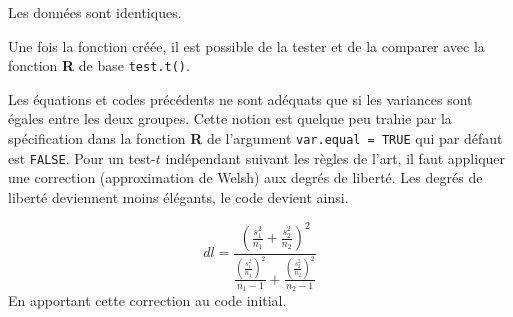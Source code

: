 \documentclass[
]{book}
\newenvironment{Shaded}{}{}
\newcommand{\AttributeTok}[1]{#1}
\newcommand{\CommentTok}[1]{\textit{#1}}
\newcommand{\ConstantTok}[1]{#1}
\newcommand{\FunctionTok}[1]{#1}
\newcommand{\NormalTok}[1]{#1}
\begin{document}
Les données sont identiques.

Une fois la fonction créée, il est possible de la tester et de la comparer avec la fonction \textbf{R} de base \texttt{test.t()}.

\begin{Shaded}
\end{Shaded}

Les équations et codes précédents ne sont adéquats que si les variances sont égales entre les deux groupes. Cette notion est quelque peu trahie par la spécification dans la fonction \textbf{R} de l'argument \texttt{var.equal\ =\ TRUE} qui par défaut est \texttt{FALSE}. Pour un test-\(t\) indépendant suivant les règles de l'art, il faut appliquer une correction (approximation de Welsh) aux degrés de liberté. Les degrés de liberté deviennent moins élégants, le code devient ainsi.

\[
dl=\frac{\left(\frac{s^2_1}{n_1}+\frac{s^2_2}{n_2}\right)^2}{\frac{\left(\frac{s^2_1}{n_1}\right)^2}{n_1-1}+\frac{\left(\frac{s^2_2}{n_2}\right)^2}{n_2-1}}
\]
En apportant cette correction au code initial.
\end{document}
